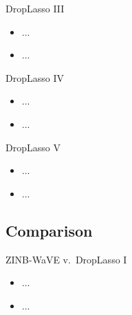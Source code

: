 \documentclass{beamer}
\begin{document}
\begin{frame}{DropLasso III}

\begin{itemize}
  \itemsep10pt
  \item ...
  \item ...
\end{itemize}

\end{frame}


\begin{frame}{DropLasso IV}

\begin{itemize}
  \itemsep10pt
  \item ...
  \item ...
\end{itemize}

\end{frame}


\begin{frame}{DropLasso V}

\begin{itemize}
  \itemsep10pt
  \item ...
  \item ...
\end{itemize}

\end{frame}

\subsection{Comparison}

\begin{frame}{ZINB-WaVE v.~DropLasso I}

\begin{itemize}
  \itemsep10pt
  \item ...
  \item ...
\end{itemize}

\end{frame}

\end{document}
